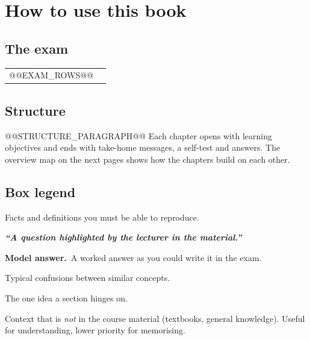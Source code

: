 \chapter{How to use this book}\label{howto:chapter}

\section*{The exam}
\begin{tabularx}{\linewidth}{@{}lX@{}}
\toprule
@@EXAM_ROWS@@
\bottomrule
\end{tabularx}

\section*{Structure}
@@STRUCTURE_PARAGRAPH@@
Each chapter opens with learning objectives and ends with take-home messages, a self-test and answers.
The overview map on the next pages shows how the chapters build on each other.

\section*{Box legend}
\begin{examcritical}
Facts and definitions you must be able to reproduce.
\end{examcritical}
\begin{tcolorbox}[studybox,colback=lecq!6,colframe=lecq,title={Lecturer question \#\hfill{\normalfont\footnotesize [Source page]}}]
\textbf{\itshape ``A question highlighted by the lecturer in the material.''}\par\smallskip
\textbf{Model answer.}\ A worked answer as you could write it in the exam.
\end{tcolorbox}
\begin{pitfall}
Typical confusions between similar concepts.
\end{pitfall}
\begin{keyidea}
The one idea a section hinges on.
\end{keyidea}
\begin{beyondslides}
Context that is \emph{not} in the course material (textbooks, general knowledge). Useful for
understanding, lower priority for memorising.
\end{beyondslides}

